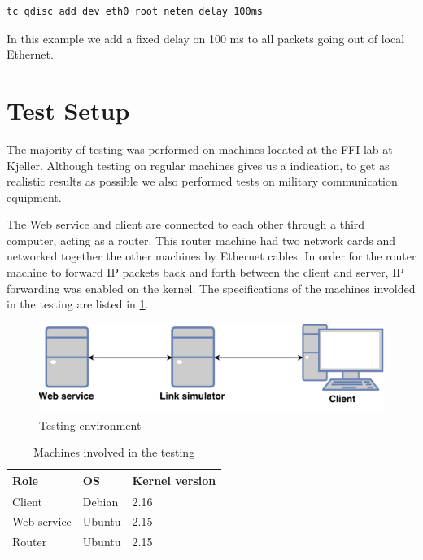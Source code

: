 \begin{lstlisting}[frame=single, caption="Emulating delay"]
  tc qdisc add dev eth0 root netem delay 100ms
\end{lstlisting}

In this example we add a fixed delay on 100 ms to all packets going out of local
Ethernet.


\section{Test Setup}
\label{testing-environment}

The majority of testing was performed on machines located at the FFI-lab at
Kjeller. Although testing on regular machines gives us a indication, to get as
realistic results as possible we also performed tests on military communication
equipment.

The Web service and client are connected to each other through a third
computer, acting as a router. This router machine had two network cards and
networked together the other machines by Ethernet cables. In order for the
router machine to forward IP packets back and forth between the client and
server, IP forwarding was enabled on the kernel. The specifications of the
machines involded in the testing are listed in \cref{table-machines}.

\begin{figure}[h]
\includegraphics[scale=0.6]{images/testing_environment.pdf}
\caption{Testing environment}
\label{figure-testing-environment}
\end{figure}


\begin{table}[h]
\begin{tabular}{| l | l | l |}
\hline
  \textbf{Role} & \textbf{OS} & \textbf{Kernel version}\\ \hline
  Client & Debian & 2.16 \\ \hline
  Web service & Ubuntu & 2.15 \\ \hline
  Router & Ubuntu & 2.15 \\ \hline
\end{tabular}
\caption{Machines involved in the testing}
\label{table-machines}
\end{table}


